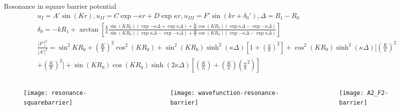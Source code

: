 \begin{frame}{Resonance in square barrier potential}
                \begin{align*}
                    &u_I=A'\sin{(Kr)},u_{II}=C\exp{-\kappa r}+D\exp{\kappa r}, u_{III}=F'\sin{(kr+\delta_0')},\Delta=R_1-R_0\\
                    &\delta_0=-kR_1+\arctan{[\frac{k}{\kappa}\frac{\sin{(KR_0)}(\exp{-\kappa\Delta}+\exp{\kappa\Delta})+\frac{K}{\kappa}\cos{(KR_0)}(\exp{\kappa\Delta}-\exp{-\kappa\Delta})}{\sin{(KR_0)}(\exp{\kappa\Delta}-\exp{-\kappa\Delta})+\frac{K}{\kappa}\cos{(KR_0)}(\exp{-\kappa\Delta}-\exp{\kappa\Delta})}]}\\
                    &\frac{|F'|^2}{|A'|^2}=\sin^2{KR_0}+(\frac{K}{k})^2\cos^2{(KR_0)}+\sin^2{(KR_0)}\sinh^2{(\kappa\Delta)}[1+(\frac{\kappa}{k})^2]+\cos^2{(KR_0)}\sinh^2{(\kappa\Delta)}[(\frac{K}{\kappa})^2\\
                    &+(\frac{K}{k})^2]+\sin{(KR_0)}\cos{(KR_0)}\sinh{(2\kappa\Delta)}[(\frac{K}{\kappa})+(\frac{K}{\kappa})(\frac{\kappa}{k}^2)]
                \end{align*}
    \begin{columns}[T]
        \begin{column}{0.33\textwidth}
            \begin{figure}[!ht]
            \texttt{[image: resonance-squarebarrier]}\label{fig:resonance-squarebarrier}
			\end{figure}
        \end{column}
        \begin{column}{0.33\textwidth}
            \begin{figure}[!ht]
            \texttt{[image: wavefunction-resonance-barrier]}\label{fig:wavefunction-resonance-barrier}
			\end{figure}
        \end{column}
        \begin{column}{0.33\textwidth}
            \begin{figure}[!ht]
            \texttt{[image: A2\_F2-barrier]}\label{fig:A2_F2-barrier}
			\end{figure}
        \end{column}
    \end{columns}
\end{frame}

